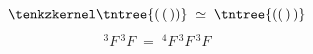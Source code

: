 \[
  \tenkzkernel
  \tntree{({}\,({}\,{}))} \;\simeq\; \tntree{(({}\,{})\,{})}
\]
\[
  {}^{3}F\,{}^{3}F \;=\; {}^{4}F\,{}^{3}F\,{}^{3}F
\]
